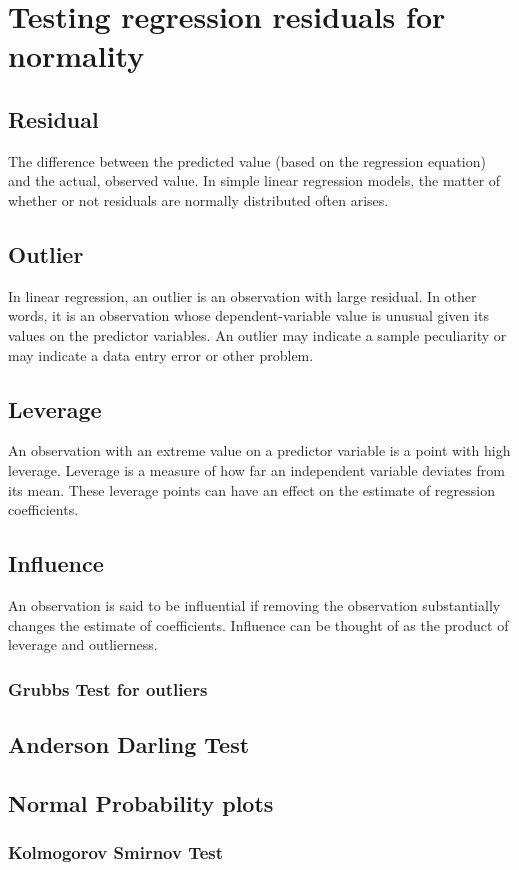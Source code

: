 \section{Testing regression residuals for normality}
\subsection{Residual}  The difference between the predicted value (based on the regression equation) and the actual, observed value. In simple linear regression models, the matter of whether or not residuals are normally distributed often arises.
\subsection{Outlier}  In linear regression, an outlier is an observation with large residual.  In other words, it is an observation whose dependent-variable value is unusual given its values on the predictor variables.  An outlier may indicate a sample peculiarity or may indicate a data entry error or other problem.
\subsection{Leverage}  An observation with an extreme value on a predictor variable is a point with high leverage.  Leverage is a measure of how far an independent variable deviates from its mean.  These leverage points can have an effect on the estimate of regression coefficients.
\subsection{Influence}  An observation is said to be influential if removing the observation substantially changes the estimate of coefficients.  Influence can be thought of as the product of leverage and outlierness.


\subsubsection{Grubbs Test for outliers}
\subsection{Anderson Darling Test}
\subsection{Normal Probability plots}
\subsubsection{ Kolmogorov Smirnov Test}
